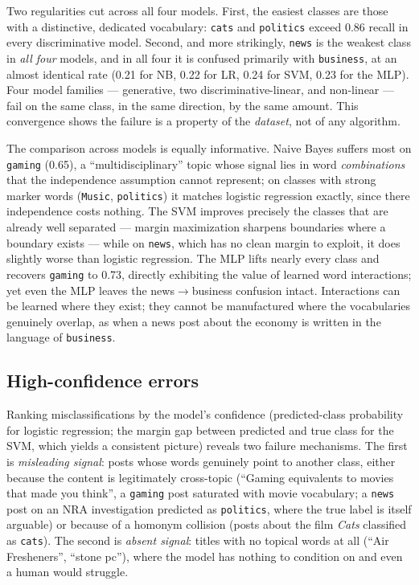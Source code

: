 \documentclass[11pt,a4paper]{article}
\begin{document}
Two regularities cut across all four models. First, the easiest classes are
those with a distinctive, dedicated vocabulary: \texttt{cats} and
\texttt{politics} exceed 0.86 recall in every discriminative model. Second,
and more strikingly, \texttt{news} is the weakest class in \emph{all four}
models, and in all four it is confused primarily with \texttt{business}, at an
almost identical rate (0.21 for NB, 0.22 for LR, 0.24 for SVM, 0.23 for the
MLP). Four model families --- generative, two discriminative-linear, and
non-linear --- fail on the same class, in the same direction, by the same
amount. This convergence shows the failure is a property of the
\emph{dataset}, not of any algorithm.
 
The comparison across models is equally informative. Naive Bayes suffers most
on \texttt{gaming} (0.65), a ``multidisciplinary'' topic whose signal lies in
word \emph{combinations} that the independence assumption cannot represent;
on classes with strong marker words (\texttt{Music}, \texttt{politics}) it
matches logistic regression exactly, since there independence costs nothing.
The SVM improves precisely the classes that are already well separated ---
margin maximization sharpens boundaries where a boundary exists --- while on
\texttt{news}, which has no clean margin to exploit, it does slightly worse
than logistic regression. The MLP lifts nearly every class and recovers
\texttt{gaming} to 0.73, directly exhibiting the value of learned word
interactions; yet even the MLP leaves the news$\to$business confusion intact.
Interactions can be learned where they exist; they cannot be manufactured
where the vocabularies genuinely overlap, as when a news post about the
economy is written in the language of \texttt{business}.
 
\subsection{High-confidence errors}
Ranking misclassifications by the model's confidence (predicted-class
probability for logistic regression; the margin gap between predicted and
true class for the SVM, which yields a consistent picture) reveals two
failure mechanisms. The first is \emph{misleading signal}: posts whose words
genuinely point to another class, either because the content is legitimately
cross-topic (``Gaming equivalents to movies that made you think'', a
\texttt{gaming} post saturated with movie vocabulary; a \texttt{news} post on
an NRA investigation predicted as \texttt{politics}, where the true label is
itself arguable) or because of a homonym collision (posts about the film
\emph{Cats} classified as \texttt{cats}). The second is \emph{absent signal}:
titles with no topical words at all (``Air Fresheners'', ``stone pc''), where
the model has nothing to condition on and even a human would struggle.
 
\end{document}

